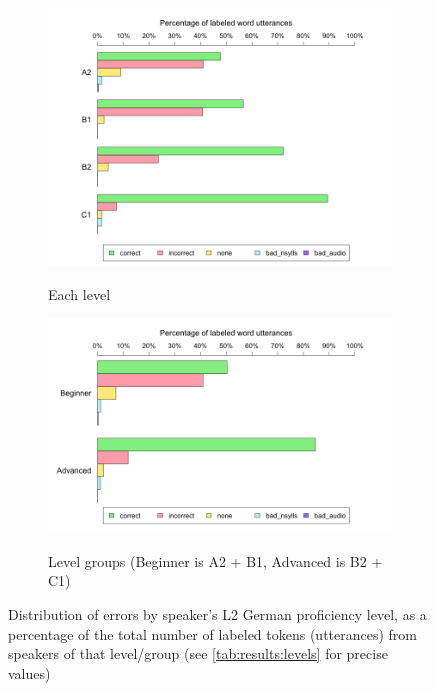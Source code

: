 			
			\begin{figure}[tbp]
				\centering
				
				\begin{subfigure}{\textwidth}
					\centering
					\caption{Each level}
					\includegraphics[width=\textwidth]{img/plots/judgments4Levels}
					\label{fig:levelbars:4}
				\end{subfigure}

				\vspace{1em}				
				
				\begin{subfigure}{\textwidth}
					\centering
					\caption{Level groups (Beginner is A2 + B1, Advanced is B2 + C1)}
					\includegraphics[width=\textwidth]{img/plots/judgmentsLevelGroups}
					\label{fig:levelbars:groups}
				\end{subfigure}
				
				
				\caption[Error distribution by proficiency level]{Distribution of errors by speaker's L2 German proficiency level,
				as a percentage of the total number of labeled tokens (utterances) from speakers of that level/group 
				(see \cref{tab:results:levels} for precise values)
				}
				\label{fig:levelbars}
			\end{figure}
			
